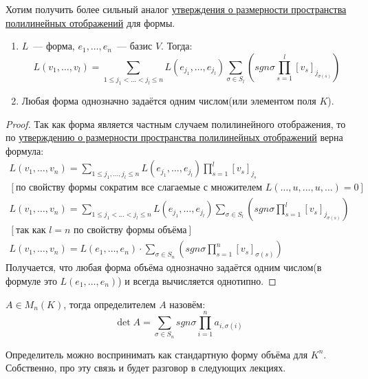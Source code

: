 \begin{motivation}
    Хотим получить более сильный аналог 
    \hyperref[stm:О размерности пространства полилинейных отображений]{утверждения о размерности пространства полилинейных отображений}
    для формы.
\end{motivation}
\begin{statement}\leavevmode
    \begin{enumerate}
        \item
            $L$~--- форма, $e_1,\dots,e_n$~--- базис $V$. Тогда:
            \[
                L(v_1,\dots, v_l) = \sum\limits_{1\le j_1<\dots<j_l\le n}{L(e_{j_1},\dots,e_{j_l})
            \sum\limits_{\sigma\in S_l}\left(sgn\sigma \prod\limits_{s=1}^{l}{[v_s]_{j_{\sigma(s)}}}\right)
                }
            \]
        \item
            Любая форма однозначно задаётся одним числом(или элементом поля $K$).
    \end{enumerate}
\end{statement}
\begin{proof}
    Так как форма является частным случаем полилинейного отображения, то по
    \hyperref[stm:О размерности пространства полилинейных отображений]{утверждению о размерности пространства полилинейных отображений}
    верна формула:
    \[
    \begin{gathered}
        L(v_1,\dots, v_n) = \sum\limits_{1\le j_1, \dots, j_l \le n}^{}{L(e_{j_1}, \dots, e_{j_l})\prod\limits_{s=1}^{l}{[v_s]_{j_s}}}\\
        [\text{по свойству формы сократим все слагаемые с множителем } L(\dots, u, \dots, u,\dots)=0]\\
        L(v_1,\dots, v_n) = \sum\limits_{1\le j_1 < \dots < j_l \le n}^{}{L(e_{j_1}, \dots, e_{j_l})
        \sum\limits_{\sigma\in S_l}\left(sgn\sigma \prod\limits_{s=1}^{l}{[v_s]_{j_{\sigma(s)}}}\right)}\\
        [\text{так как $l=n$ по свойству формы объёма}]\\
        L(v_1,\dots, v_n) = L(e_1,\dots, e_n)\cdot \sum\limits_{\sigma\in S_n}^{}
        \left(sgn\sigma\prod_{s = 1}^{n}{[v_s]_{\sigma(s)}}\right)
    \end{gathered}
    \] 
    Получается, что любая форма объёма однозначно задаётся одним числом(в формуле это $L(e_1,\dots, e_n)$) 
    и всегда вычисляется однотипно.
\end{proof}
\begin{definition}
    $A\in M_n(K)$, тогда определителем $A$ назовём:
    \[
        \det A = 
        \sum\limits_{\sigma\in S_n} {sgn\sigma \prod\limits_{i = 1}^{n}{a_{i, \sigma(i)}}}
    \]
\end{definition}
\begin{remark}
    Определитель можно воспринимать как стандартную форму объёма
    для $K^n$. Собственно, про эту связь и будет разговор в следующих лекциях.
\end{remark}
